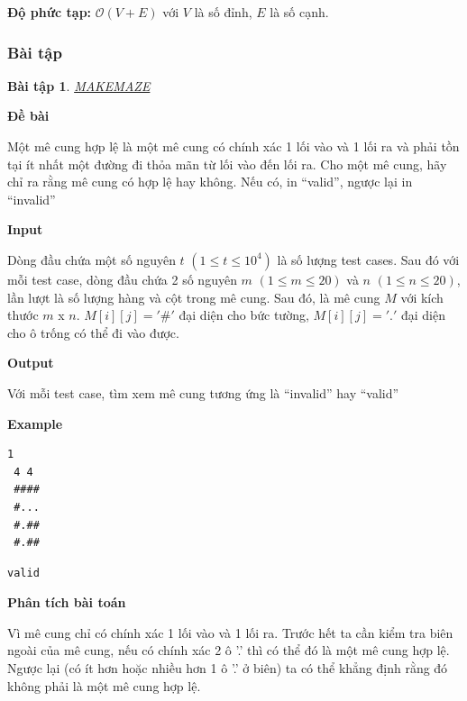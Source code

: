\documentclass{article}
\newtheorem{baitap}{Bài tập}
\begin{document}
\textbf{Độ phức tạp: } $\mathcal{O}(V + E)$ với $V$ là số đỉnh, $E$ là số cạnh.

\subsubsection{Bài tập}
\begin{baitap}    
    \href{https://www.spoj.com/problems/MAKEMAZE/}{MAKEMAZE}
\end{baitap} 

\textbf{Đề bài}

Một mê cung hợp lệ là một mê cung có chính xác 1 lối vào và 1 lối ra  và phải tồn tại ít nhất một đường đi thỏa mãn từ lối vào đến lối ra. Cho một mê cung, hãy chỉ ra rằng mê cung có hợp lệ hay không. Nếu có, in ``valid'', ngược lại in ``invalid''

\textbf{Input}

Dòng đầu chứa một số nguyên $t$ $(1 \leq t \leq 10^4)$ là số lượng test cases. Sau đó với mỗi test case, dòng đầu chứa 2 số nguyên $m$ $(1 \leq m \leq 20)$ và $n$ $(1 \leq n \leq 20)$, lần lượt là số lượng hàng và cột trong mê cung. Sau đó, là mê cung $M$ với kích thước $m$ x $n$. $M[i][j] = '\#'$ đại diện cho bức tường, $M[i][j] = '.'$ đại diện cho ô trống có thể đi vào được.

\textbf{Output}

Với mỗi test case, tìm xem mê cung tương ứng là ``invalid'' hay ``valid''

\textbf{Example}

\begin{lstlisting}[caption={Input}]
 1
 4 4 
 ####
 #...  
 #.## 
 #.## 
\end{lstlisting}

\begin{lstlisting}[caption={Output}]
valid
\end{lstlisting}


\textbf{Phân tích bài toán}

Vì mê cung chỉ có chính xác 1 lối vào và 1 lối ra. Trước hết ta cần kiểm tra biên ngoài của mê cung, nếu có chính xác 2 ô '.' thì có thể đó là một mê cung hợp lệ. Ngược lại (có ít hơn hoặc nhiều hơn 1 ô '.' ở biên) ta có thể khẳng định rằng đó không phải là một mê cung hợp lệ. \\
\end{document}

